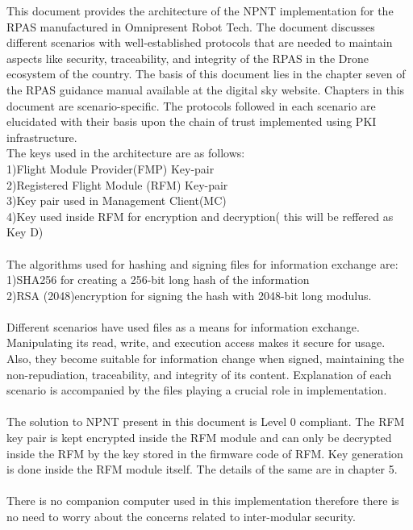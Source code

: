 \documentclass[18pt]{article}
\begin{document}
This document provides the architecture of the NPNT implementation for the RPAS manufactured in Omnipresent Robot Tech.  The document discusses different scenarios with well-established protocols that are needed to maintain aspects like security, traceability, and integrity of the RPAS in the Drone ecosystem of the country. 
The basis of this document lies in the chapter seven of the RPAS guidance manual available at the digital sky website. Chapters in this document are scenario-specific. The protocols followed in each scenario are elucidated with their basis upon the chain of trust implemented using PKI infrastructure.\\
The  keys used in the architecture are as follows:\\
1)Flight Module Provider(FMP) Key-pair\\
2)Registered Flight Module (RFM) Key-pair\\
3)Key pair used in Management Client(MC)\\
4)Key used inside RFM for encryption and decryption( this will be reffered as Key D)\\
\\
The algorithms used for hashing and signing files for information exchange are:\\
1)SHA256 for creating a 256-bit long hash of the information\\
2)RSA (2048)encryption for signing the hash with 2048-bit long modulus.\\
\\
 Different scenarios have used files as a means for information exchange. Manipulating its read, write, and execution access makes it secure for usage. Also, they become suitable for information change when signed, maintaining the non-repudiation, traceability, and integrity of its content. Explanation of each scenario is accompanied by the files playing a crucial role in implementation.\\
\\
The solution to NPNT present in this document is  Level 0 compliant. The RFM key pair is kept encrypted inside the RFM module and can only be decrypted inside the RFM by the key stored in the firmware code of RFM. Key generation is done inside the RFM module itself. The details of the same are in chapter 5.\\
\\
There is no companion computer used in this implementation therefore there is no need to worry about the concerns related to inter-modular security.\\
\end{document}
